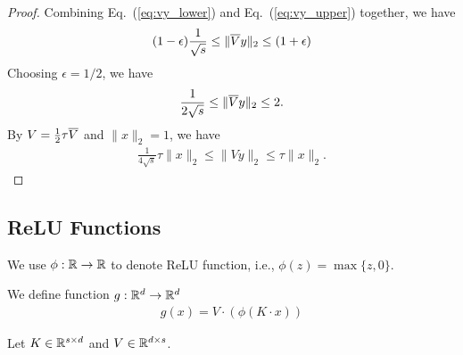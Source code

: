 \begin{proof}
Combining Eq.~(\ref{eq:vy_lower})%
 and Eq.~(\ref{eq:vy_upper}) together, we have
\begin{align*}
(1-\epsilon) \frac{1}{\sqrt{s}}  \leq \| \overline{V} y \|_2 \leq (1+\epsilon) 
\end{align*} 
Choosing $\epsilon = 1/2$, we have %
\begin{align*}
 \frac{1}{2\sqrt{s}}  \leq \| \overline{V} y \|_2 \leq 2.
\end{align*}
By $V = \frac{1}{2} \tau \overline{V}$ and $\|x\|_2 = 1$, we have%
\begin{align*}
\frac{1}{4\sqrt{s}} \tau \| x \|_2 \leq \| V y \|_2 \leq   \tau \| x \|_2.
\end{align*} 

\end{proof}

\subsection{ReLU Functions}\label{sec:relu_func}

We use $\phi : \mathbb{R} \rightarrow \mathbb{R}$ to denote ReLU function, i.e., $\phi(z) = \max\{z,0\}$.

We define function $g : \mathbb{R}^d \rightarrow \mathbb{R}^d$
\begin{align}\label{eq:g_x}
g (x) =  V \cdot ( \phi (K \cdot x) ) 
\end{align}

Let $K \in \mathbb{R}^{s \times d}$ and $V \in \mathbb{R}^{d \times s}$.

